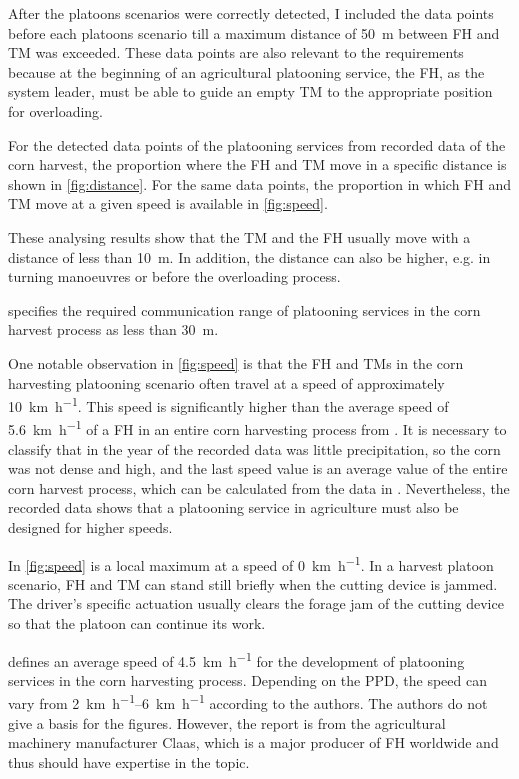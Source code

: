 After the platoons scenarios were correctly detected, I included the data points before each platoons scenario till a maximum distance of \SI{50}{\metre} between \ac{FH} and \ac{TM} was exceeded. These data points are also relevant to the requirements because at the beginning of an agricultural platooning service, the \ac{FH}, as the system leader, must be able to guide an empty \ac{TM} to the appropriate position for overloading.

For the detected data points of the platooning services from recorded data of the corn harvest, the proportion where the \ac{FH} and \ac{TM} move in a specific distance is shown in \autoref{fig:distance}. For the same data points, the proportion in which \ac{FH} and \ac{TM} move at a given speed is available in \autoref{fig:speed}.

These analysing results show that the \ac{TM} and the \ac{FH} usually move with a distance of less than \SI{10}{\metre}. In addition, the distance can also be higher, e.g. in turning manoeuvres or before the overloading process.

\textcite{smolnik_5g_2020} specifies the required communication range of platooning services in the corn harvest process as less than \SI{30}{\metre}.

One notable observation in \autoref{fig:speed} is that the \ac{FH} and \ac{TM}s in the corn harvesting platooning scenario often travel at a speed of approximately \SI{10}{\kilo\metre\per\hour}. This speed is significantly higher than the average speed of \SI{5.6}{\kilo\metre\per\hour} of a \ac{FH} in an entire corn harvesting process from \cite{faustzahlen2018}. It is necessary to classify that in the year of the recorded data was little precipitation, so the corn was not dense and high, and the last speed value is an average value of the entire corn harvest process, which can be calculated from the data in \cite{faustzahlen2018}.
Nevertheless, the recorded data shows that a platooning service in agriculture must also be designed for higher speeds. 

In \autoref{fig:speed} is a local maximum at a speed of \SI{0}{\kilo\metre\per\hour}. In a harvest platoon scenario, \ac{FH} and \ac{TM} can stand still briefly when the cutting device is jammed.
The driver's specific actuation usually clears the forage jam of the cutting device so that the platoon can continue its work.

\textcite{smolnik_5g_2020} defines an average speed of \SI{4.5}{\kilo\metre\per\hour} for the development of platooning services in the corn harvesting process. Depending on the \ac{PPD}, the speed can vary from \SIrange{2}{6}{\kilo\metre\per\hour} according to the authors.
The authors do not give a basis for the figures. However, the report is from the agricultural machinery manufacturer Claas, which is a major producer of \ac{FH} worldwide and thus should have expertise in the topic.

